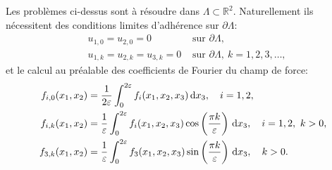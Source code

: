 Les problèmes ci-dessus sont à résoudre dans $\Lambda \subset
\mathbb R^2$. Naturellement ils nécessitent des
conditions limites d'adhérence sur $\partial \Lambda$:
\begin{align}
  & u_{1,0} = u_{2,0} = 0 & \text{ sur } \partial \Lambda,\\
  & u_{1,k} = u_{2,k} = u_{3,k} = 0 &\text{ sur } \partial \Lambda,\ k
  = 1, 2, 3,\dots,
\end{align}
et le calcul au préalable des coefficients de Fourier du champ de force:
\begin{align}
  f_{i,0}(x_1, x_2) %
  &= \frac{1}{2\thickness}\int_0^{2\thickness}f_i(x_1, x_2, x_3)%
  \,\mathrm dx_3,\quad i = 1,2,\label{eq:force-coefficient-1}\\
  f_{i,k}(x_1, x_2) %
  &= \frac{1}{\thickness}\int_0^{2\thickness}f_i(x_1, x_2, x_3)%
  \cos\parent{\frac{\pi k}{\thickness}}\,\mathrm dx_3,\quad i = 1,2,\ k > 0,\label{eq:force-coefficient-2}\\
  f_{3,k}(x_1, x_2)%
  &= \frac{1}{\thickness}\int_0^{2\thickness}f_3(x_1, x_2, x_3)%
  \sin\parent{\frac{\pi k}{\thickness}}\,\mathrm dx_3,\quad k > 0.\label{eq:force-coefficient-3}
\end{align}


